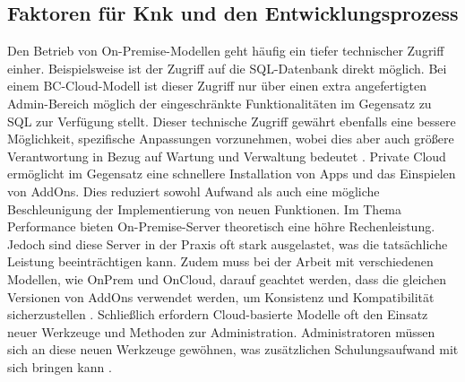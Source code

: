 \documentclass[12pt,bibtotoc]{article}
\begin{document}
			\subsection{Faktoren für Knk und den Entwicklungsprozess}
			Den Betrieb von On-Premise-Modellen geht häufig ein tiefer technischer Zugriff einher. Beispielsweise ist der Zugriff auf die SQL-Datenbank direkt möglich. 
			Bei einem BC-Cloud-Modell ist dieser Zugriff nur über einen extra angefertigten Admin-Bereich möglich der eingeschränkte Funktionalitäten im Gegensatz zu SQL zur Verfügung stellt.
			Dieser technische Zugriff gewährt ebenfalls eine bessere Möglichkeit, spezifische Anpassungen vorzunehmen, wobei dies aber auch größere Verantwortung in Bezug auf Wartung und Verwaltung bedeutet \cite{Anhang}. \newline
			Private Cloud ermöglicht im Gegensatz eine schnellere Installation von Apps und das Einspielen von AddOns. Dies reduziert sowohl Aufwand als auch eine mögliche Beschleunigung der Implementierung von neuen Funktionen.
			Im Thema Performance bieten On-Premise-Server theoretisch eine höhre Rechenleistung. Jedoch sind diese Server in der Praxis oft stark ausgelastet, was die tatsächliche Leistung beeinträchtigen kann.
			Zudem muss bei der Arbeit mit verschiedenen Modellen, wie OnPrem und OnCloud, darauf geachtet werden, dass die gleichen Versionen von AddOns verwendet werden, um Konsistenz und Kompatibilität sicherzustellen \cite{Anhang}. \newline
			Schließlich erfordern Cloud-basierte Modelle oft den Einsatz neuer Werkzeuge und Methoden zur Administration. Administratoren müssen sich an diese neuen Werkzeuge gewöhnen, was zusätzlichen Schulungsaufwand mit sich bringen kann \cite{Anhang}.
			
			\newpage
\end{document}

